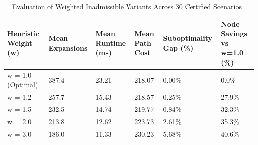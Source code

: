\begin{table}[htbp]
\centering
\caption{Evaluation of Weighted Inadmissible Variants Across 30 Certified Scenarios | \stampline}
\label{tab:partB_inadmissible_variants}
\begin{tabular}{llllll}
\toprule
Heuristic Weight (w) & Mean Expansions & Mean Runtime (ms) & Mean Path Cost & Suboptimality Gap (\%) & Node Savings vs w=1.0 (\%) \\
\midrule
w = 1.0 (Optimal) & 387.4 & 23.21 & 218.07 & 0.00\% & 0.0\% \\
w = 1.2 & 257.7 & 15.43 & 218.57 & 0.25\% & 27.9\% \\
w = 1.5 & 232.5 & 14.74 & 219.77 & 0.84\% & 32.3\% \\
w = 2.0 & 213.8 & 12.62 & 223.73 & 2.61\% & 35.3\% \\
w = 3.0 & 186.0 & 11.33 & 230.23 & 5.68\% & 40.6\% \\
\bottomrule
\end{tabular}

\end{table}
